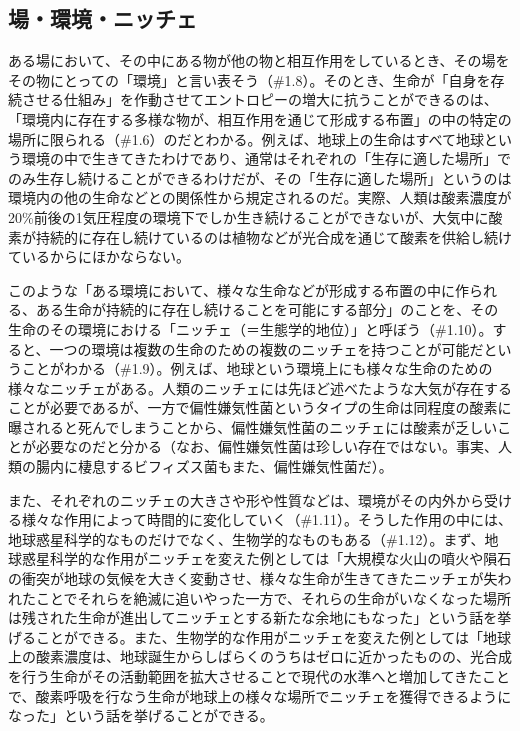 \subsection{場・環境・ニッチェ}\label{ux5834ux74b0ux5883ux30cbux30c3ux30c1ux30a7}

ある場において、その中にある物が他の物と相互作用をしているとき、その場をその物にとっての「環境」と言い表そう（\#1.8）。そのとき、生命が「自身を存続させる仕組み」を作動させてエントロピーの増大に抗うことができるのは、「環境内に存在する多様な物が、相互作用を通じて形成する布置」の中の特定の場所に限られる（\#1.6）のだとわかる。例えば、地球上の生命はすべて地球という環境の中で生きてきたわけであり、通常はそれぞれの「生存に適した場所」でのみ生存し続けることができるわけだが、その「生存に適した場所」というのは環境内の他の生命などとの関係性から規定されるのだ。実際、人類は酸素濃度が20\%前後の1気圧程度の環境下でしか生き続けることができないが、大気中に酸素が持続的に存在し続けているのは植物などが光合成を通じて酸素を供給し続けているからにほかならない。

このような「ある環境において、様々な生命などが形成する布置の中に作られる、ある生命が持続的に存在し続けることを可能にする部分」のことを、その生命のその環境における「ニッチェ（＝生態学的地位）」と呼ぼう（\#1.10）。すると、一つの環境は複数の生命のための複数のニッチェを持つことが可能だということがわかる（\#1.9）。例えば、地球という環境上にも様々な生命のための様々なニッチェがある。人類のニッチェには先ほど述べたような大気が存在することが必要であるが、一方で偏性嫌気性菌というタイプの生命は同程度の酸素に曝されると死んでしまうことから、偏性嫌気性菌のニッチェには酸素が乏しいことが必要なのだと分かる（なお、偏性嫌気性菌は珍しい存在ではない。事実、人類の腸内に棲息するビフィズス菌もまた、偏性嫌気性菌だ）。

また、それぞれのニッチェの大きさや形や性質などは、環境がその内外から受ける様々な作用によって時間的に変化していく（\#1.11）。そうした作用の中には、地球惑星科学的なものだけでなく、生物学的なものもある（\#1.12）。まず、地球惑星科学的な作用がニッチェを変えた例としては「大規模な火山の噴火や隕石の衝突が地球の気候を大きく変動させ、様々な生命が生きてきたニッチェが失われたことでそれらを絶滅に追いやった一方で、それらの生命がいなくなった場所は残された生命が進出してニッチェとする新たな余地にもなった」という話を挙げることができる。また、生物学的な作用がニッチェを変えた例としては「地球上の酸素濃度は、地球誕生からしばらくのうちはゼロに近かったものの、光合成を行う生命がその活動範囲を拡大させることで現代の水準へと増加してきたことで、酸素呼吸を行なう生命が地球上の様々な場所でニッチェを獲得できるようになった」という話を挙げることができる。

